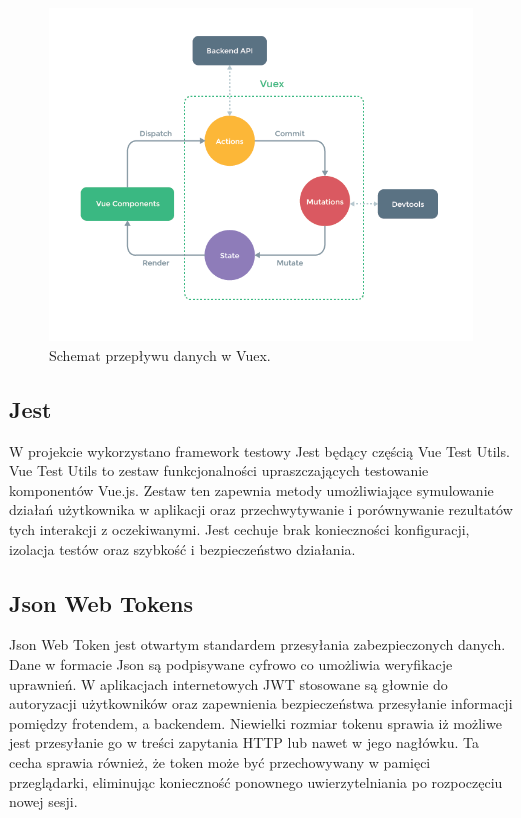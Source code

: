 \begin{figure}[t]
\centering\includegraphics[width=\textwidth]{figures/vuex}
\caption{Schemat przepływu danych w Vuex.}\label{rys:vuex}
\end{figure}

\subsection{Jest}
W projekcie wykorzystano framework testowy Jest będący częścią Vue Test Utils. Vue Test Utils to zestaw funkcjonalności upraszczających testowanie komponentów Vue.js. Zestaw ten zapewnia metody umożliwiające symulowanie działań użytkownika w aplikacji oraz przechwytywanie i porównywanie rezultatów tych interakcji z oczekiwanymi. Jest cechuje brak konieczności konfiguracji, izolacja testów oraz szybkość i bezpieczeństwo działania.
\subsection{Json Web Tokens}
Json Web Token jest otwartym standardem przesyłania zabezpieczonych danych. Dane w formacie Json są podpisywane cyfrowo co umożliwia weryfikacje uprawnień. W aplikacjach internetowych JWT stosowane są głownie do autoryzacji użytkowników oraz zapewnienia bezpieczeństwa przesyłanie informacji pomiędzy frotendem, a backendem. Niewielki rozmiar tokenu sprawia iż możliwe jest przesyłanie go w treści zapytania HTTP lub nawet w jego nagłówku. Ta cecha sprawia również, że token może być przechowywany w pamięci przeglądarki, eliminując konieczność ponownego uwierzytelniania po rozpoczęciu nowej sesji.
